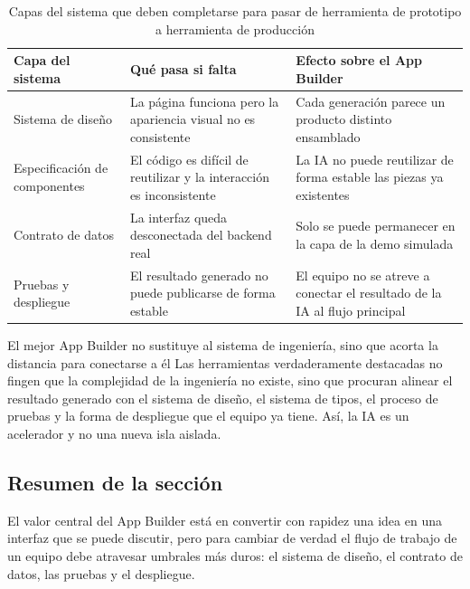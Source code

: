 \begin{table}[H]
\centering
\begin{tabular}{p{} p{} p{}}
\toprule
Capa del sistema & Qué pasa si falta & Efecto sobre el App Builder \\
\midrule
Sistema de diseño & La página funciona pero la apariencia visual no es consistente & Cada generación parece un producto distinto ensamblado \\
Especificación de componentes & El código es difícil de reutilizar y la interacción es inconsistente & La IA no puede reutilizar de forma estable las piezas ya existentes \\
Contrato de datos & La interfaz queda desconectada del backend real & Solo se puede permanecer en la capa de la demo simulada \\
Pruebas y despliegue & El resultado generado no puede publicarse de forma estable & El equipo no se atreve a conectar el resultado de la IA al flujo principal \\
\bottomrule
\end{tabular}
\caption{Capas del sistema que deben completarse para pasar de herramienta de prototipo a herramienta de producción}
\end{table}

\begin{knowledgebox}{El mejor App Builder no sustituye al sistema de ingeniería, sino que acorta la distancia para conectarse a él}
Las herramientas verdaderamente destacadas no fingen que la complejidad de la ingeniería no existe, sino que procuran alinear el resultado generado con el sistema de diseño, el sistema de tipos, el proceso de pruebas y la forma de despliegue que el equipo ya tiene. Así, la IA es un acelerador y no una nueva isla aislada.
\end{knowledgebox}

\subsection{Resumen de la sección}

El valor central del App Builder está en convertir con rapidez una idea en una interfaz que se puede discutir, pero para cambiar de verdad el flujo de trabajo de un equipo debe atravesar umbrales más duros: el sistema de diseño, el contrato de datos, las pruebas y el despliegue.


